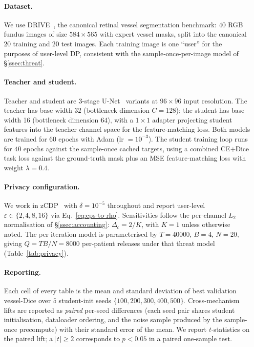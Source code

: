 \paragraph{Dataset.} We use DRIVE~\cite{staal2004drive}, the
canonical retinal vessel segmentation benchmark: $40$ RGB fundus images
of size $584\!\times\!565$ with expert vessel masks, split into the
canonical $20$ training and $20$ test images. Each training image is one
``user'' for the purposes of user-level DP, consistent with the
sample-once-per-image model of \S\ref{ssec:threat}.

\paragraph{Teacher and student.} Teacher and student are 3-stage
U-Net~\cite{ronneberger2015unet} variants at $96\!\times\!96$ input
resolution. The teacher has base width 32 (bottleneck dimension
$C\!=\!128$); the student has base width 16 (bottleneck dimension
$64$), with a $1\!\times\!1$ adapter projecting student features into
the teacher channel space for the feature-matching loss. Both models
are trained for $60$ epochs with Adam (lr $=\!10^{-3}$). The student
training loop runs for $40$ epochs against the sample-once cached
targets, using a combined CE+Dice task loss against the ground-truth
mask plus an MSE feature-matching loss with weight $\lambda\!=\!0.4$.

\paragraph{Privacy configuration.} We work in zCDP~\cite{bun2016concentrated}
with $\delta\!=\!10^{-5}$ throughout and report user-level
$\varepsilon\!\in\!\{2, 4, 8, 16\}$ via Eq.~\eqref{eq:eps-to-rho}.
Sensitivities follow the per-channel $L_2$ normalisation of
\S\ref{ssec:accounting}: $\Delta_c\!=\!2/K$, with $K\!=\!1$ unless
otherwise noted. The per-iteration model is parameterised by
$T\!=\!40000$, $B\!=\!4$, $N\!=\!20$, giving $Q\!=\!TB/N\!=\!8000$
per-patient releases under that threat model (Table~\ref{tab:privacy}).

\paragraph{Reporting.} Each cell of every table is the mean and standard
deviation of best validation vessel-Dice over $5$ student-init seeds
$\{100, 200, 300, 400, 500\}$. Cross-mechanism lifts are reported as
\emph{paired} per-seed differences (each seed pair shares student
initialisation, dataloader ordering, and the noise sample produced by
the sample-once precompute) with their standard error of the mean. We
report $t$-statistics on the paired lift; a $|t|\!\geq\!2$ corresponds
to $p\!<\!0.05$ in a paired one-sample test.

